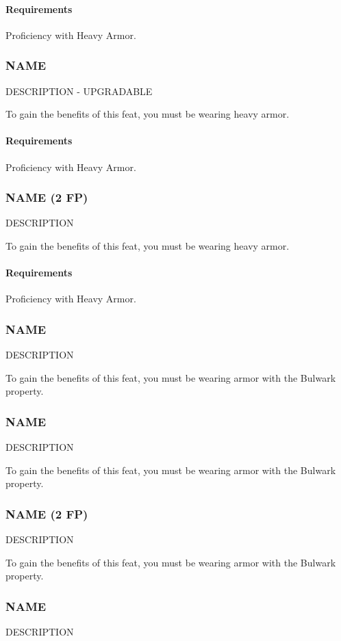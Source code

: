     \paragraph{Requirements} Proficiency with Heavy Armor.
\subsubsection{NAME} \label{feat::name}
    DESCRIPTION - UPGRADABLE

    To gain the benefits of this feat, you must be wearing heavy armor.
    \paragraph{Requirements} Proficiency with Heavy Armor.
\subsubsection{NAME (2 FP)} \label{feat::name}
    DESCRIPTION

    To gain the benefits of this feat, you must be wearing heavy armor.
    \paragraph{Requirements} Proficiency with Heavy Armor.

\subsubsection{NAME} \label{feat::name}
    DESCRIPTION

    To gain the benefits of this feat, you must be wearing armor with the Bulwark property.
\subsubsection{NAME} \label{feat::name}
    DESCRIPTION

    To gain the benefits of this feat, you must be wearing armor with the Bulwark property.
\subsubsection{NAME (2 FP)} \label{feat::name}
    DESCRIPTION

    To gain the benefits of this feat, you must be wearing armor with the Bulwark property.
\subsubsection{NAME} \label{feat::name}
    DESCRIPTION


